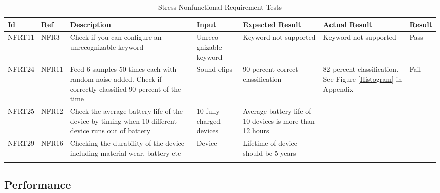 \documentclass[12pt, titlepage]{article}
\begin{document}
\begin{longtable}{|p{1.4cm}|p{1.1cm}|p{2.5cm}|p{1.5cm}|p{2.2cm}|p{1.9cm}|p{1.2cm}|}
\endlastfoot
  \hline
  \textbf{Id} & \textbf{Ref} & \textbf{Description}                                                         & \textbf{Input}                                    & \textbf{Expected Result}    & \textbf{Actual Result}                          & \textbf{Result}                                     \\ \hline
  NFRT11        & NFR3          & Check if you can configure an unrecognizable keyword              & Unreco-gnizable keyword                          & Keyword not supported                      & Keyword not supported                         & {\color[HTML]{32CB00} Pass}                         \\ \hline
  NFRT24        & NFR11         & Feed 6 samples 50 times each with random noise added. Check if correctly classified 90 percent of the time           & Sound clips   & 90 percent correct classification        & 82 percent classification. See Figure \ref*{Histogram} in Appendix     & {\color[HTML]{FE0000} Fail}                           \\ \hline
  NFRT25        & NFR12         & Check the average battery life of the device by timing when 10 different device runs out of battery  & 10 fully charged devices   & Average battery life of 10 devices is more than 12 hours                   &                     &\cellcolor[HTML]{FFFFFF}{\color[HTML]{F8A102} TBD}                          \\ \hline
  NFRT29        & NFR16         & Checking the durability of the device including material wear, battery etc & Device  & Lifetime of device should be 5 years&          & \cellcolor[HTML]{FFFFFF}{\color[HTML]{F8A102} TBD}                        \\ \hline
  \caption{Stress Nonfunctional Requirement Tests}
  \label{stressNonfunctionalRequirementTests}
\end{longtable}
\subsection{Performance}
\end{document}
